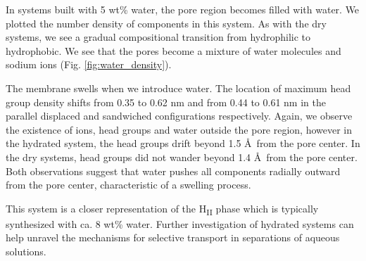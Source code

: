 \documentclass{article}
\begin{document}
  In systems built with 5 wt\% water, the pore region becomes filled with
  water. We plotted the number density of components in this system. As with the 
  dry systems, we see a gradual compositional transition from hydrophilic to hydrophobic.  
  We see that the pores become a mixture of water molecules and sodium ions (Fig.
  \ref{fig:water_density}). 
  
  The membrane swells when we introduce water. The location of maximum head
  group density shifts from 0.35 to 0.62 nm and from 0.44 to 0.61 nm in the
  parallel displaced and sandwiched configurations respectively. Again, we
  observe the existence of ions, head groups and water outside the pore region,
  however in the hydrated system, the head groups drift beyond 1.5 \AA~from the
  pore center. In the dry systems, head groups did not wander beyond 1.4 \AA~from
  the pore center. Both observations suggest that water pushes all components
  radially outward from the pore center, characteristic of a swelling process. 
   
  This system is a closer representation of the H\textsubscript{II} phase which
  is typically synthesized with ca. 8 wt\% water. Further investigation of
  hydrated systems can help unravel the mechanisms for selective transport in
  separations of aqueous solutions. 
\end{document}
